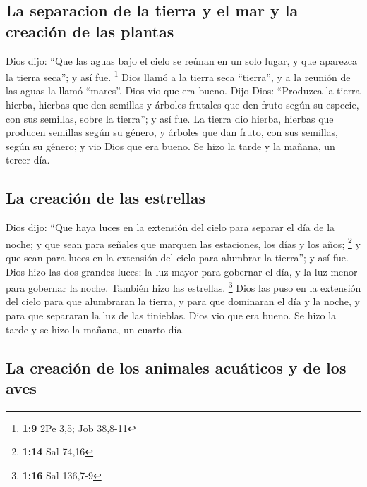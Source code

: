 \begin{paracol}{2}
\hypertarget{la-separacion-de-la-tierra-y-el-mar-y-la-creaciuxf3n-de-las-plantas}{%
\subsection{La separacion de la tierra y el mar y la creación de las
plantas}\label{la-separacion-de-la-tierra-y-el-mar-y-la-creaciuxf3n-de-las-plantas}}

 Dios dijo: ``Que las aguas bajo el cielo se reúnan en un
solo lugar, y que aparezca la tierra seca''; y así fue. \footnote{\textbf{1:9}
  2Pe 3,5; Job 38,8-11}  Dios llamó a la tierra seca
``tierra'', y a la reunión de las aguas la llamó ``mares''. Dios vio que
era bueno.  Dijo Dios: ``Produzca la tierra hierba,
hierbas que den semillas y árboles frutales que den fruto según su
especie, con sus semillas, sobre la tierra''; y así fue. 
La tierra dio hierba, hierbas que producen semillas según su género, y
árboles que dan fruto, con sus semillas, según su género; y vio Dios que
era bueno.  Se hizo la tarde y la mañana, un tercer día.

\hypertarget{la-creaciuxf3n-de-las-estrellas}{%
\subsection{La creación de las
estrellas}\label{la-creaciuxf3n-de-las-estrellas}}

 Dios dijo: ``Que haya luces en la extensión del cielo
para separar el día de la noche; y que sean para señales que marquen las
estaciones, los días y los años; \footnote{\textbf{1:14} Sal 74,16}
 y que sean para luces en la extensión del cielo para
alumbrar la tierra''; y así fue.  Dios hizo las dos
grandes luces: la luz mayor para gobernar el día, y la luz menor para
gobernar la noche. También hizo las estrellas. \footnote{\textbf{1:16}
  Sal 136,7-9}  Dios las puso en la extensión del cielo
para que alumbraran la tierra,  y para que dominaran el
día y la noche, y para que separaran la luz de las tinieblas. Dios vio
que era bueno.  Se hizo la tarde y se hizo la mañana, un
cuarto día.

\hypertarget{la-creaciuxf3n-de-los-animales-acuuxe1ticos-y-de-los-aves}{%
\subsection{La creación de los animales acuáticos y de los
aves}\label{la-creaciuxf3n-de-los-animales-acuuxe1ticos-y-de-los-aves}}


\end{paracol}
